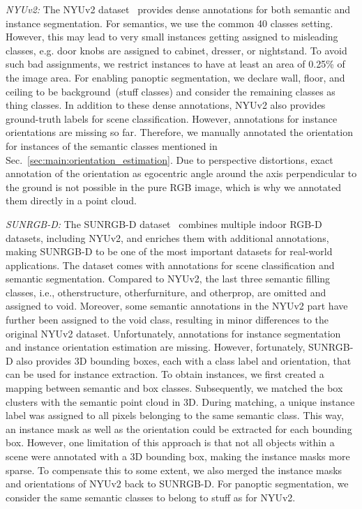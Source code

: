 \documentclass[conference]{IEEEtran}
\begin{document}
\textit{NYUv2:} \enspace The NYUv2 dataset~\cite{NYUv2-eccv2012} provides dense annotations for both semantic and instance segmentation.
For semantics, we use the common 40 classes setting.
However, this may lead to very small instances getting assigned to misleading classes, e.g. door knobs are assigned to cabinet, dresser, or nightstand. 
To avoid such bad assignments, we restrict instances to have at least an area of 
0.25\% of the image area.
For enabling panoptic segmentation, we declare wall, floor, and ceiling to be background~(stuff classes) and consider the remaining classes as thing classes.
In addition to these dense annotations, NYUv2 also provides ground-truth labels for scene classification.
However, annotations for instance orientations are missing so far. Therefore, we manually annotated the orientation for instances of the semantic classes mentioned in Sec.~\ref{sec:main:orientation_estimation}.
Due to perspective distortions, exact annotation of the orientation as egocentric angle around the axis perpendicular to the ground is not possible in the pure RGB image, which is why we annotated them directly in a point cloud.

\textit{SUNRGB-D:} \enspace The SUNRGB-D dataset~\cite{SUNRGBD-cvpr2015} combines multiple indoor \mbox{RGB-D} datasets, including NYUv2, and enriches them with additional annotations, making SUNRGB-D to be one of the most important datasets for real-world applications.
The dataset comes with annotations for scene classification and semantic segmentation.
Compared to NYUv2, the last three semantic filling classes, i.e., otherstructure, otherfurniture, and otherprop, are omitted and assigned to void.
Moreover, some semantic annotations in the NYUv2 part have further been assigned to the void class, resulting in minor differences to the original NYUv2 dataset.
Unfortunately, annotations for instance segmentation and instance orientation estimation are missing.
However, fortunately, SUNRGB-D also provides 3D bounding boxes, each with a class label and orientation, that can be used for instance extraction.
To obtain instances, we first created a mapping between semantic and box classes. 
Subsequently, we matched the box clusters with the semantic point cloud in 3D.
During matching, a unique instance label was assigned to all pixels belonging to the same semantic class.
This way, an instance mask as well as the orientation could be extracted for each bounding box.
However, one limitation of this approach is that not all objects within a scene were annotated with a 3D bounding box, making the instance masks more sparse.
To compensate this to some extent, we also merged the instance masks and orientations of NYUv2 back to \mbox{SUNRGB-D}.
For panoptic segmentation, we consider the same semantic classes to belong to stuff as for NYUv2.
\end{document}

